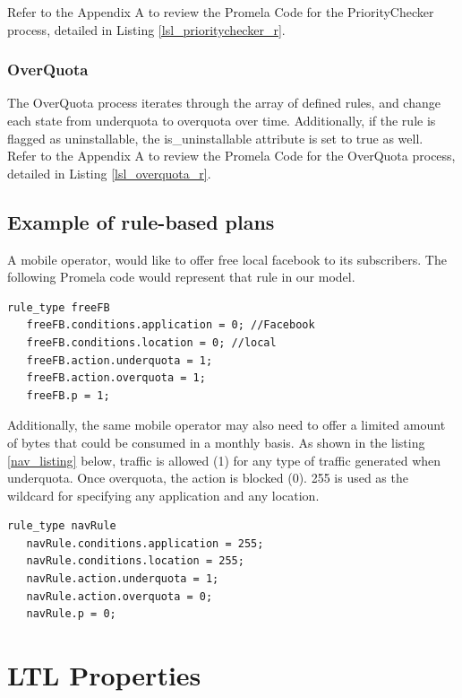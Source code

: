 Refer to the Appendix A to review the Promela Code for the PriorityChecker process, detailed in Listing  \ref{lsl_prioritychecker_r}. 

\subsubsection{OverQuota}
\noindent
The OverQuota process iterates through the array of defined rules, and change each state from underquota to overquota over time. Additionally, if the rule is flagged as uninstallable, the is\_uninstallable attribute is set to true as well. \\

Refer to the Appendix A to review the Promela Code for the OverQuota process, detailed in Listing  \ref{lsl_overquota_r}. 
\subsection{Example of rule-based plans}
\noindent
A mobile operator, would like to offer free local facebook to its subscribers. The following Promela code would represent that rule in our model. 


\singlespacing
\begin{lstlisting}[caption=Free Facebook Rule.,
  label=fb_listing]
   rule_type freeFB
   freeFB.conditions.application = 0; //Facebook
   freeFB.conditions.location = 0; //local
   freeFB.action.underquota = 1;
   freeFB.action.overquota = 1;
   freeFB.p = 1;
\end{lstlisting}
\doublespacing

Additionally, the same mobile operator may also need to offer a limited amount of bytes that could be consumed in a monthly basis. As shown in the listing \ref{nav_listing} below, traffic is allowed (1) for any type of traffic generated when underquota. Once overquota, the action is blocked (0). 255 is used as the wildcard for specifying any application and any location. 

\singlespacing
\begin{lstlisting}[caption=Free Navigation Rule.,
  label=nav_listing]
   rule_type navRule
   navRule.conditions.application = 255;
   navRule.conditions.location = 255;
   navRule.action.underquota = 1;
   navRule.action.overquota = 0;
   navRule.p = 0;
\end{lstlisting}
\doublespacing

\section{LTL Properties}
